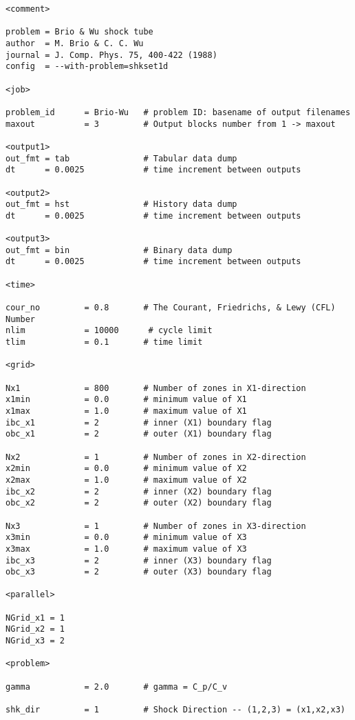 \footnotesize
\begin{verbatim}
<comment>

problem = Brio & Wu shock tube
author  = M. Brio & C. C. Wu 
journal = J. Comp. Phys. 75, 400-422 (1988)
config  = --with-problem=shkset1d

<job>

problem_id      = Brio-Wu   # problem ID: basename of output filenames
maxout          = 3         # Output blocks number from 1 -> maxout

<output1>
out_fmt = tab               # Tabular data dump
dt      = 0.0025            # time increment between outputs

<output2>
out_fmt = hst               # History data dump
dt      = 0.0025            # time increment between outputs

<output3>
out_fmt = bin               # Binary data dump
dt      = 0.0025            # time increment between outputs

<time>

cour_no         = 0.8       # The Courant, Friedrichs, & Lewy (CFL) Number
nlim            = 10000      # cycle limit
tlim            = 0.1       # time limit

<grid>

Nx1             = 800       # Number of zones in X1-direction
x1min           = 0.0       # minimum value of X1
x1max           = 1.0       # maximum value of X1
ibc_x1          = 2         # inner (X1) boundary flag
obc_x1          = 2         # outer (X1) boundary flag

Nx2             = 1         # Number of zones in X2-direction
x2min           = 0.0       # minimum value of X2
x2max           = 1.0       # maximum value of X2
ibc_x2          = 2         # inner (X2) boundary flag
obc_x2          = 2         # outer (X2) boundary flag

Nx3             = 1         # Number of zones in X3-direction
x3min           = 0.0       # minimum value of X3
x3max           = 1.0       # maximum value of X3
ibc_x3          = 2         # inner (X3) boundary flag
obc_x3          = 2         # outer (X3) boundary flag

<parallel>

NGrid_x1 = 1
NGrid_x2 = 1
NGrid_x3 = 2

<problem>

gamma           = 2.0       # gamma = C_p/C_v

shk_dir         = 1         # Shock Direction -- (1,2,3) = (x1,x2,x3)


\end{verbatim}
